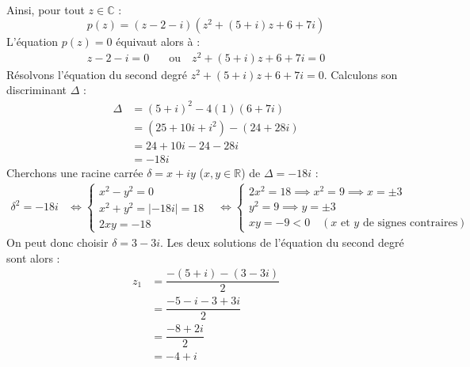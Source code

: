 \documentclass[12pt,a4paper]{article}
\begin{document}
\begin{enumerate}
\begin{enumerate}
$$\begin{aligned}
        \end{aligned}
        $$
        Ainsi, pour tout $z \in \mathbb{C}$ :
        $$
        p(z) = (z - 2 - i)\left(z^2 + (5 + i)z + 6 + 7i\right)
        $$
        L'équation $p(z) = 0$ équivaut alors à :
        $$
        \begin{aligned}
            z - 2 - i = 0 \quad &\text{ou} \quad z^2 + (5 + i)z + 6 + 7i = 0
        \end{aligned}
        $$
        Résolvons l'équation du second degré $z^2 + (5 + i)z + 6 + 7i = 0$. Calculons son discriminant $\Delta$ :
        $$
        \begin{aligned}
            \Delta &= (5 + i)^2 - 4(1)(6 + 7i) \\
            &= (25 + 10i + i^2) - (24 + 28i) \\
            &= 24 + 10i - 24 - 28i \\
            &= -18i
        \end{aligned}
        $$
        Cherchons une racine carrée $\delta = x + iy$ ($x, y \in \mathbb{R}$) de $\Delta = -18i$ :
        $$
        \begin{aligned}
            \delta^2 = -18i &\iff
            \left\{
            \begin{array}{l}
                x^2 - y^2 = 0 \\
                x^2 + y^2 = |-18i| = 18 \\
                2xy = -18
            \end{array}
            \right.
            &\iff
            \left\{
            \begin{array}{l}
                2x^2 = 18 \implies x^2 = 9 \implies x = \pm 3 \\
                y^2 = 9 \implies y = \pm 3 \\
                xy = -9 < 0 \quad (x \text{ et } y \text{ de signes contraires})
            \end{array}
            \right.
        \end{aligned}
        $$
        On peut donc choisir $\delta = 3 - 3i$. Les deux solutions de l'équation du second degré sont alors :
        $$
        \begin{aligned}
            z_1 &= \dfrac{-(5 + i) - (3 - 3i)}{2} \\
            &= \dfrac{-5 - i - 3 + 3i}{2} \\
            &= \dfrac{-8 + 2i}{2} \\
            &= -4 + i
        \end{aligned}
$$
\end{enumerate}
\end{enumerate}
\end{document}
